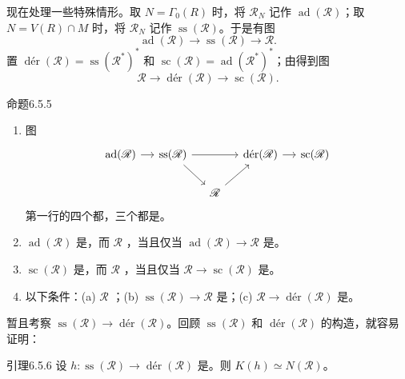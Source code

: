 现在处理一些特殊情形。取 $N=\Gamma_0(R)$ 时，将 $\mathscr R_N$ 记作 $\operatorname{ad}(\mathscr R)$；取 $N=V(R)\cap M$ 时，将 $\mathscr R_N$ 记作 $\operatorname{ss}(\mathscr R)$。于是有图
\[\operatorname{ad}(\mathscr R)\longrightarrow\operatorname{ss}(\mathscr R)\longrightarrow\mathscr R.\]
置 $\operatorname{d\text{é}r}(\mathscr R)=\operatorname{ss}(\mathscr R^*)^*$ 和 $\operatorname{sc}(\mathscr R)=\operatorname{ad}(\mathscr R^*)^*$；由得到图
\[\mathscr R\longrightarrow\operatorname{d\text{é}r}(\mathscr R)\longrightarrow\operatorname{sc}(\mathscr R).\]
\begin{SGAresult}{命题}{6.5.5}
\begin{enumerate}
\item[(i)] 图
\[\begin{tikzcd}[column sep=small]
\operatorname{ad}(\mathscr R)\arrow[r]&\operatorname{ss}(\mathscr R)\arrow[rr]\arrow[dr]&&\operatorname{d\text{é}r}(\mathscr R)\arrow[r]&\operatorname{sc}(\mathscr R)\\
&&\mathscr R\arrow[ur]&&
\end{tikzcd}\]
第一行的四个都，三个都是。
\item[(ii)] $\operatorname{ad}(\mathscr R)$ 是，而 $\mathscr R$ ，当且仅当 $\operatorname{ad}(\mathscr R)\to\mathscr R$ 是。
\item[(iii)] $\operatorname{sc}(\mathscr R)$ 是，而 $\mathscr R$ ，当且仅当 $\mathscr R\to\operatorname{sc}(\mathscr R)$ 是。
\item[(iv)] 以下条件：(a) $\mathscr R$ ；(b) $\operatorname{ss}(\mathscr R)\to\mathscr R$ 是；(c) $\mathscr R\to\operatorname{d\text{é}r}(\mathscr R)$ 是。
\end{enumerate}
\end{SGAresult}
暂且考察 $\operatorname{ss}(\mathscr R)\to\operatorname{d\text{é}r}(\mathscr R)$。回顾 $\operatorname{ss}(\mathscr R)$ 和 $\operatorname{d\text{é}r}(\mathscr R)$ 的构造，就容易证明：
\begin{SGAresult}{引理}{6.5.6}
设 $h:\operatorname{ss}(\mathscr R)\to\operatorname{d\text{é}r}(\mathscr R)$ 是。则 $K(h)\simeq N(\mathscr R)$。
\end{SGAresult}
